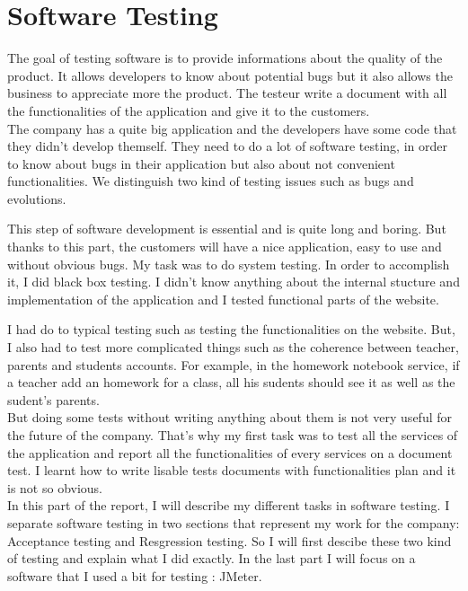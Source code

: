 
\section{Software Testing}

	The goal of testing software is to provide informations about the quality of the product. 
	It allows developers to know about potential bugs but it also allows the business 
	to appreciate more the product. The testeur write a document with all the 
	functionalities of the application and give it to the customers.\\  

The company has a quite big application and the developers have some code that they didn't develop
 themself. They need to do a lot of software testing, in order to know about
bugs in their application but also about not convenient functionalities. We distinguish 
two kind of testing issues such as bugs and evolutions. 

This step of software development is essential and is quite
long and boring. But thanks to this part, the customers will have a nice application, 
easy to use and without obvious bugs. 
My task was to do system testing. In order to accomplish it, I did black box testing. 
I didn't know anything about the internal stucture and implementation of the application
and I tested functional parts of the website.

I had do to typical testing such as testing the functionalities on the website. 
But, I also had to test more complicated things such as the coherence between 
teacher, parents and students accounts. For example, in the homework notebook service, 
if a teacher add an homework for a class, all his sudents should see it as well as 
	the sudent's parents. \\



But doing some tests without writing anything about them is not very useful for the future 
of the company. That's why my first task was to test all the services of the application and report all the 
functionalities of every services on a document test. 
I learnt how to write lisable tests documents with functionalities plan and it is not so obvious. \\ 

In this part of the report, I will describe my different tasks in software testing. 
I separate software testing in two sections that represent my work for the company: 
Acceptance testing and Resgression testing. So I will first descibe these two kind of 
testing and explain what I did exactly. 
In the last part I will focus on a software that I used a bit for testing : JMeter.  \\

